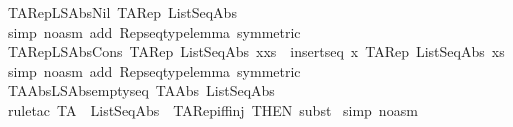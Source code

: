 \begin{isabellebody}
\isamarkupfalse%
%
\endisatagproof
{\isafoldproof}%
%
\isadelimproof
\isanewline
%
\endisadelimproof
\isanewline
{}\isamarkupfalse%
\ TARep{\isacharunderscore}LSAbs{\isacharunderscore}Nil{\isacharcolon}\ {\isachardoublequoteopen}TARep\ ListSeqAbs\ {\isacharbrackleft}{\isacharbrackright}\ {\isacharequal}\ {\isacharpercent}{\isacharless}{\isacharpercent}{\isachargreater}{\isachardoublequoteclose}\isanewline
%
\isadelimproof
%
\endisadelimproof
%
\isatagproof
{}\isamarkupfalse%
\ {\isacharparenleft}simp\ {\isacharparenleft}no{\isacharunderscore}asm{\isacharparenright}\ add{\isacharcolon}\ Rep{\isacharunderscore}seqtype{\isacharunderscore}lemma\ {\isacharbrackleft}symmetric{\isacharbrackright}{\isacharparenright}\isanewline
{}\isamarkupfalse%
%
\endisatagproof
{\isafoldproof}%
%
\isadelimproof
\isanewline
%
\endisadelimproof
\isanewline
{}\isamarkupfalse%
\ TARep{\isacharunderscore}LSAbs{\isacharunderscore}Cons{\isacharcolon}\ {\isachardoublequoteopen}TARep\ ListSeqAbs\ {\isacharparenleft}x{\isacharhash}xs{\isacharparenright}\ {\isacharequal}\ insertseq\ x\ {\isacharparenleft}TARep\ ListSeqAbs\ xs{\isacharparenright}{\isachardoublequoteclose}\isanewline
%
\isadelimproof
%
\endisadelimproof
%
\isatagproof
{}\isamarkupfalse%
\ {\isacharparenleft}simp\ {\isacharparenleft}no{\isacharunderscore}asm{\isacharparenright}\ add{\isacharcolon}\ Rep{\isacharunderscore}seqtype{\isacharunderscore}lemma\ {\isacharbrackleft}symmetric{\isacharbrackright}{\isacharparenright}\isanewline
{}\isamarkupfalse%
%
\endisatagproof
{\isafoldproof}%
%
\isadelimproof
\isanewline
%
\endisadelimproof
\isanewline
{}\isamarkupfalse%
\ TAAbs{\isacharunderscore}LSAbs{\isacharunderscore}emptyseq{\isacharcolon}\ {\isachardoublequoteopen}{\isacharparenleft}TAAbs\ ListSeqAbs\ {\isacharpercent}{\isacharless}{\isacharpercent}{\isachargreater}{\isacharparenright}\ {\isacharequal}\ {\isacharbrackleft}{\isacharbrackright}{\isachardoublequoteclose}\isanewline
%
\isadelimproof
%
\endisadelimproof
%
\isatagproof
{}\isamarkupfalse%
\ {\isacharparenleft}rule{\isacharunderscore}tac\ TA{}\ {\isacharequal}\ {\isachardoublequoteopen}ListSeqAbs{\isachardoublequoteclose}\ \ TARep{\isacharunderscore}iff{\isacharunderscore}inj\ {\isacharbrackleft}THEN\ subst{\isacharbrackright}{\isacharparenright}\isanewline
{}\isamarkupfalse%
\ {\isacharparenleft}simp\ {\isacharparenleft}no{\isacharunderscore}asm{\isacharparenright}{\isacharparenright}\isanewline

\end{isabellebody}
